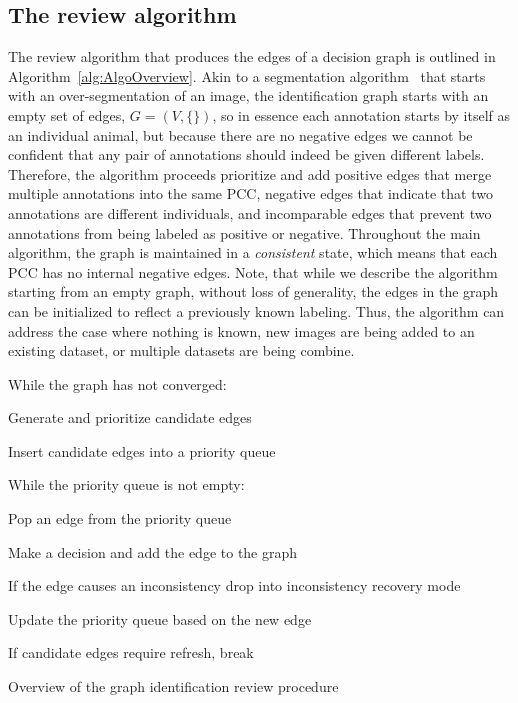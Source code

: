 \FloatBarrier{}
\subsection{The review algorithm}\label{sub:graphalgo}


The review algorithm that produces the edges of a decision graph is outlined in Algorithm~\ref{alg:AlgoOverview}.
Akin to a segmentation algorithm~\cite{fulkerson_class_2009} that starts with an over-segmentation of an image,
  the identification graph starts with an empty set of edges, $G = (V, \{ \})$, so in essence each annotation
  starts by itself as an individual animal, but because there are no negative edges we cannot be confident that any
  pair of annotations should indeed be given different labels.
Therefore, the algorithm proceeds prioritize and add positive edges that merge multiple annotations into the same
  PCC, negative edges that indicate that two annotations are different individuals, and incomparable edges that
  prevent two annotations from being labeled as positive or negative.
Throughout the main algorithm, the graph is maintained in a \emph{consistent} state, which means that each PCC
  has no internal negative edges.
Note, that while we describe the algorithm starting from an empty graph, without loss of generality, the edges in
  the graph can be initialized to reflect a previously known labeling.
Thus, the algorithm can address the case where nothing is known, new images are being added to an existing
  dataset, or multiple datasets are being combine.


\begin{algorithm}
        While the graph has not converged:
        \begin{enumln}
            \item Generate and prioritize candidate edges 
            \item Insert candidate edges into a priority queue 
            \item While the priority queue is not empty:
            \begin{enumln}
                \item Pop an edge from the priority queue
                \item Make a decision and add the edge to the graph
                \item If the edge causes an inconsistency drop into inconsistency recovery mode
                \item Update the priority queue based on the new edge
                \item If candidate edges require refresh, break
            \end{enumln}
        \end{enumln}
\caption[Algorithm Overview]{Overview of the graph identification review procedure}
\label{alg:AlgoOverview}
\end{algorithm}

